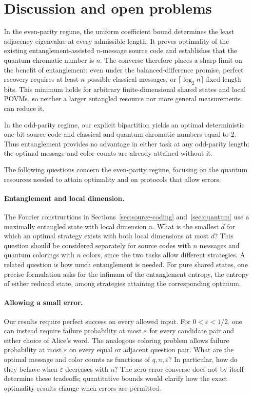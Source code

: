 \documentclass[11pt,a4paper]{article}
\numberwithin{equation}{section}
\numberwithin{figure}{section}
\numberwithin{table}{section}
\numberwithin{footnote}{section}
\theoremstyle{informal}\newtheorem*{informaltheorem}{Informal theorem}
\theoremstyle{definition}\newtheorem{example}{Example}[section]
\theoremstyle{remark}\newtheorem{remark}[theorem]{Remark}
\begin{document}
\section{Discussion and open problems}\label{sec:discussion}
In the even-parity regime, the uniform coefficient bound determines
the least adjacency eigenvalue at every admissible length. It proves
optimality of the existing entanglement-assisted \(n\)-message source
code and establishes that the quantum chromatic number is \(n\).
The converse therefore places a sharp limit on the benefit of
entanglement: even under the balanced-difference promise, perfect
recovery requires at least \(n\) possible classical messages, or
\(\lceil\log_2 n\rceil\) fixed-length bits. This minimum holds for
arbitrary finite-dimensional shared states and local POVMs, so
neither a larger entangled resource nor more general measurements
can reduce it.

In the odd-parity regime, our explicit bipartition yields an optimal
deterministic one-bit source code and classical and quantum chromatic
numbers equal to \(2\). Thus entanglement provides no advantage in
either task at any odd-parity length: the optimal message and color
counts are already attained without it.

The following questions concern the even-parity regime, focusing on
the quantum resources needed to attain optimality and on protocols
that allow errors.

\paragraph{Entanglement and local dimension.}
The Fourier constructions in Sections~\ref{sec:source-coding}
and~\ref{sec:quantum} use a maximally entangled state with local
dimension \(n\). What is the smallest \(d\) for which an optimal
strategy exists with both local dimensions at most \(d\)? This
question should be considered separately for source codes with
\(n\) messages and quantum colorings with \(n\) colors, since the
two tasks allow different strategies. A related question is how
much entanglement is needed. For pure shared states, one precise
formulation asks for the infimum of the entanglement entropy,
the entropy of either reduced state, among strategies attaining
the corresponding optimum.

\paragraph{Allowing a small error.}
Our results require perfect success on every allowed input.
For \(0<\varepsilon<1/2\), one can instead require failure
probability at most \(\varepsilon\) for every candidate pair and
either choice of Alice's word. The analogous coloring problem
allows failure probability at most \(\varepsilon\) on every equal
or adjacent question pair. What are the optimal message and color
counts as functions of \(q,n,\varepsilon\)? In particular, how do
they behave when \(\varepsilon\) decreases with \(n\)?
The zero-error converse does not by itself determine these
tradeoffs; quantitative bounds would clarify how the exact
optimality results change when errors are permitted.
\end{document}
